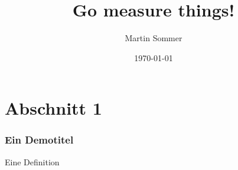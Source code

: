 \documentclass{beamer}
\title{Go measure things!}
\author{Martin Sommer}
\date{\today}
\begin{document}
\maketitle


\frame{\tableofcontents[currentsection]}

\section{Abschnitt 1}
\begin{frame} %
  \frametitle{Ein Demotitel} %
  \begin{Definition} %
    Eine Definition
  \end{Definition}
\end{frame}
\end{document}
